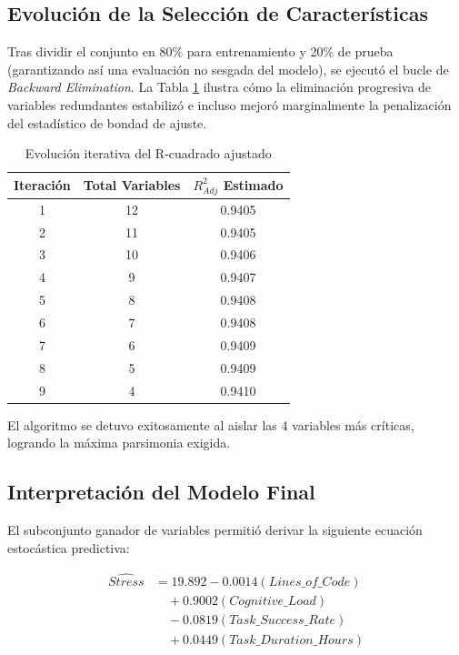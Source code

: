 \documentclass[conference]{IEEEtran}
\begin{document}
\subsection{Evolución de la Selección de Características}
Tras dividir el conjunto en 80\% para entrenamiento y 20\% de prueba (garantizando así una evaluación no sesgada del modelo), se ejecutó el bucle de \textit{Backward Elimination}. La Tabla \ref{tab:modelos} ilustra cómo la eliminación progresiva de variables redundantes estabilizó e incluso mejoró marginalmente la penalización del estadístico de bondad de ajuste.

\begin{table}[H]
\centering
\caption{Evolución iterativa del R-cuadrado ajustado}
\label{tab:modelos}
\begin{tabular}{ccc}
\toprule
Iteración & Total Variables & $R^2_{Adj}$ Estimado \\
\midrule
1 & 12 & 0.9405 \\
2 & 11 & 0.9405 \\
3 & 10 & 0.9406 \\
4 & 9 & 0.9407 \\
5 & 8 & 0.9408 \\
6 & 7 & 0.9408 \\
7 & 6 & 0.9409 \\
8 & 5 & 0.9409 \\
9 & 4 & 0.9410 \\
\bottomrule
\end{tabular}
\end{table}

El algoritmo se detuvo exitosamente al aislar las 4 variables más críticas, logrando la máxima parsimonia exigida.

\subsection{Interpretación del Modelo Final}
El subconjunto ganador de variables permitió derivar la siguiente ecuación estocástica predictiva:

\begin{equation}
\begin{aligned}
\widehat{Stress} &= 19.892 - 0.0014(Lines\_of\_Code) \\
&\quad + 0.9002(Cognitive\_Load) \\
&\quad - 0.0819(Task\_Success\_Rate) \\
&\quad + 0.0449(Task\_Duration\_Hours)
\end{aligned}
\end{equation}
\end{document}
